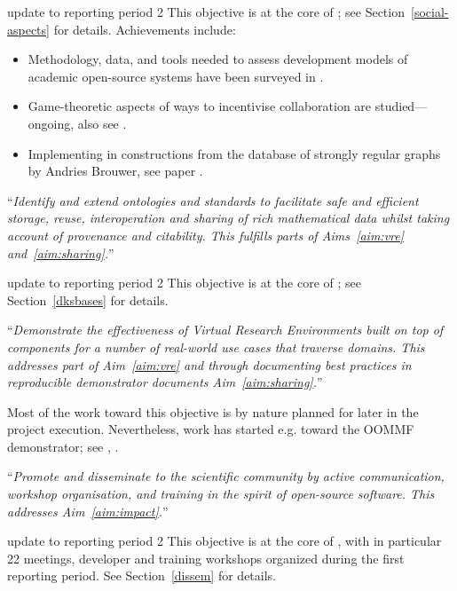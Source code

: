 \begin{compactenum}[\bf O1\rm:]
\begin{oldpart}{update to reporting period 2}
  This objective is at the core of ; see
  Section~\ref{social-aspects} for details.
  Achievements include:
  \begin{itemize}
  \item Methodology, data, and tools needed to assess
    development models of academic open-source systems have been surveyed in
    .
  \item Game-theoretic aspects of ways to incentivise
  collaboration are studied---ongoing, also see \cite{Pavlou:2016:MCI:2936924.2936934}.
  \item Implementing in \Sage constructions from the database of
  strongly regular graphs by Andries Brouwer, see paper \cite{2016arXiv160100181C}.
  \end{itemize}
\end{oldpart}

\item \label{objective:data} ``\emph{Identify and extend ontologies and
  standards to facilitate safe and efficient storage, reuse,
  interoperation and sharing of rich mathematical data whilst taking
  account of provenance and citability. This fulfills parts of
  Aims~\ref{aim:vre} and~\ref{aim:sharing}.}''
 
\begin{oldpart}{update to reporting period 2}
 This objective is at the core of ; see
  Section~\ref{dksbases} for details. 
\end{oldpart}

\item \label{objective:demo} ``\emph{Demonstrate the effectiveness of Virtual
  Research Environments built on top of \ODK components for a
  number of real-world use cases that traverse domains. This addresses
  part of Aim~\ref{aim:vre} and through documenting best practices in
  reproducible demonstrator documents Aim~\ref{aim:sharing}.}''

  Most of the work toward this objective is by nature planned for
  later in the project execution. Nevertheless, work has started e.g.
  toward the OOMMF demonstrator; see
  ,
  .

\item \label{objective:disseminate} ``\emph{Promote and disseminate
  \ODK to the scientific community by active communication,
  workshop organisation, and training in the spirit of open-source
  software. This addresses Aim~\ref{aim:impact}.}''

\begin{oldpart}{update to reporting period 2}
  This objective is at the core of , with in particular
  22 meetings, developer and training workshops organized during the
  first reporting period. See Section~\ref{dissem} for details.
\end{oldpart}
\end{compactenum}

